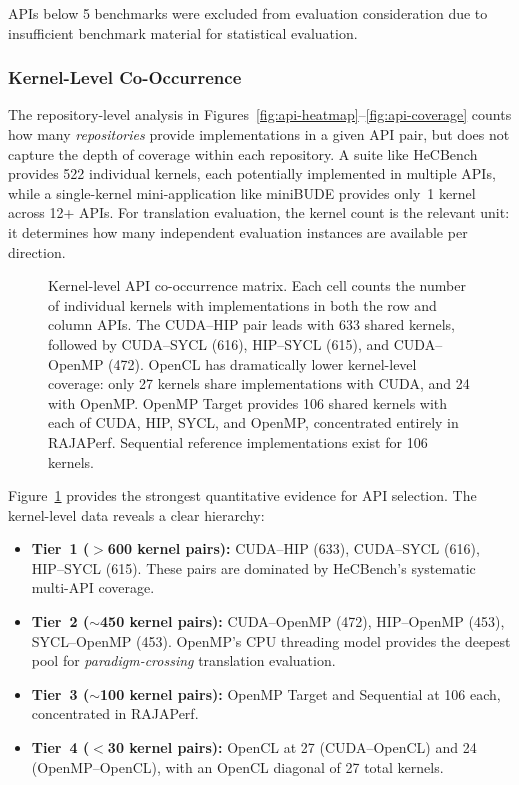 APIs below 5 benchmarks were excluded from evaluation consideration due to insufficient benchmark material for statistical evaluation.

\subsubsection*{Kernel-Level Co-Occurrence}

The repository-level analysis in Figures~\ref{fig:api-heatmap}--\ref{fig:api-coverage} counts how many \emph{repositories} provide implementations in a given API pair, but does not capture the depth of coverage within each repository. A suite like HeCBench provides 522 individual kernels, each potentially implemented in multiple APIs, while a single-kernel mini-application like miniBUDE provides only~1 kernel across 12+ APIs. For translation evaluation, the kernel count is the relevant unit: it determines how many independent evaluation instances are available per direction.

\begin{figure}[htbp]
    \centering
    \caption{Kernel-level API co-occurrence matrix. Each cell counts the number of individual kernels with implementations in both the row and column APIs. The CUDA--HIP pair leads with 633 shared kernels, followed by CUDA--SYCL (616), HIP--SYCL (615), and CUDA--OpenMP (472). OpenCL has dramatically lower kernel-level coverage: only 27 kernels share implementations with CUDA, and 24 with OpenMP. OpenMP Target provides 106 shared kernels with each of CUDA, HIP, SYCL, and OpenMP, concentrated entirely in RAJAPerf. Sequential reference implementations exist for 106 kernels.}
    \label{fig:kernel-cooccurrence}
\end{figure}

Figure~\ref{fig:kernel-cooccurrence} provides the strongest quantitative evidence for API selection. The kernel-level data reveals a clear hierarchy:

\begin{itemize}
    \item \textbf{Tier~1 ($>$600 kernel pairs):} CUDA--HIP (633), CUDA--SYCL (616), HIP--SYCL (615). These pairs are dominated by HeCBench's systematic multi-API coverage.
    \item \textbf{Tier~2 (${\sim}$450 kernel pairs):} CUDA--OpenMP (472), HIP--OpenMP (453), SYCL--OpenMP (453). OpenMP's CPU threading model provides the deepest pool for \emph{paradigm-crossing} translation evaluation.
    \item \textbf{Tier~3 (${\sim}$100 kernel pairs):} OpenMP Target and Sequential at 106 each, concentrated in RAJAPerf.
    \item \textbf{Tier~4 ($<$30 kernel pairs):} OpenCL at 27 (CUDA--OpenCL) and 24 (OpenMP--OpenCL), with an OpenCL diagonal of 27 total kernels.
\end{itemize}

